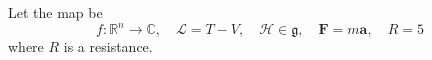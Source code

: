 \documentclass{article}
\begin{document}
Let the map be
\[ f:\mathbb{R}^n \to \mathbb{C}, \quad \mathcal{L} = T - V, \quad \mathscr{H} \in \mathfrak{g}, \quad \mathbf{F} = m\mathbf{a}, \quad R = 5 \]
where $R$ is a resistance.
\end{document}
